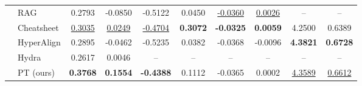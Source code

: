 \begin{table}[t]
\begin{tabular*}{\textwidth}{@{\extracolsep{\fill}}llcccccccc@{}}
& RAG
& 0.2793
& -0.0850
& -0.5122
& 0.0450
& \underline{-0.0360}
& \underline{0.0026}
& --
& -- \\

& Cheatsheet
& \underline{0.3035}
& \underline{0.0249}
& \underline{-0.4704}
& \textbf{0.3072}
& \textbf{-0.0325}
& \textbf{0.0059}
& 4.2500
& 0.6389 \\

& HyperAlign
& 0.2895
& -0.0462
& -0.5235
& 0.0382
& -0.0368
& -0.0096
& \textbf{4.3821}
& \textbf{0.6728} \\

& Hydra
& 0.2617
& 0.0046
& --
& --
& --
& --
& --
& -- \\

\cmidrule(lr){2-10}
& PT (ours)
& \textbf{0.3768}
& \textbf{0.1554}
& \textbf{-0.4388}
& 0.1112
& -0.0365
& 0.0002
& \underline{4.3589}
& \underline{0.6612} \\

\bottomrule
\end{tabular*}
\end{table}
